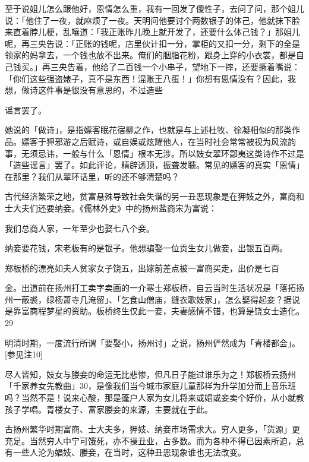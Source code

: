 \begin{BookQuote}
至于说姐儿怎么跟他好，恩情怎么重，我有一回发了傻性子，去问了问，那个姐儿说：「他住了一夜，就麻烦了一夜。天明问他要讨个两数银子的体己，他就抹下脸来直着脖儿梗，乱嚷道：「我正账昨儿晚上就开发了，还要什么体己钱？」那姐儿呢，再三央告说：「正账的钱呢，店里伙计扣一分，掌柜的又扣一分，剩下的全是领家的妈拿去，一个钱也放不出来。俺们的胭脂花粉，跟身上穿的小衣裳，都是自己钱买。」再三央告着，他给了二百钱一个小串子，望地下一摔，还要撅着嘴说：「你们这些强盗婊子，真不是东西！混账王八蛋！」你想有恩情没有？因此，我想，做诗这件事是很没有意思的，不过造些
\end{BookQuote}

谣言罢了。

她说的「做诗」，是指嫖客眠花宿柳之作，也就是与上述杜牧、徐凝相似的那类作品。嫖客于狎邪游之后赋诗，或自娱或炫耀他人，在当时社会常常被视为风流韵事，无须忌讳，一般与什么「恩情」根本无涉。所以妓女翠环鄙夷这类诗作不过是「造些谣言」罢了。如此评论，精辟透顶，振聋发聩。常见的嫖客的真实「恩情」在那里？我们从翠环话里，听的还不够清楚吗？

古代经济繁荣之地，贫富悬殊导致社会失谐的另一丑恶现象是在狎妓之外，富商和士大夫们还要纳妾。《儒林外史》中的扬州盐商宋为富说：

\begin{BookQuote}
我们总商人家，一年至少也娶七八个妾。
\end{BookQuote}

纳妾要花钱，宋老板有的是银子。他想骗娶一位贡生女儿做妾，出银五百两。

郑板桥的漂亮如夫人贫家女子饶五，出嫁前差点被一富商买走，出价是七百


\noindent 金。出道前在扬州打工卖字卖画的一介寒士郑板桥，自云当时生活状况是「落拓扬州一蔽裘，绿杨萧寺几淹留」、「乞食山僧庙，缝衣歌妓家」，怎么娶得起妾？据说是靠富商程梦星的资助。板桥终生仅此一妾，夫妻感情不错，也算是饶女士造化。29

明清时期，一度流行所谓「要娶小，扬州讨」之说，扬州俨然成为「青楼都会」。[参见注10]

尽人皆知，妓女与媵妾的命运无比悲惨，但凡日子能过谁乐为之！郑板桥云扬州「千家养女先教曲」30，是像我们当今城市家庭儿童那样为升学加分而上音乐班吗？当然不是！说来心酸，那是蓬户人家为女儿将来或娼或妾卖个好价，从小就教孩子学唱。青楼女子、富家媵妾的来源，主要就在于此。

古扬州繁华时期富商、士大夫多，狎妓、纳妾市场需求大。穷人更多，「货源」更充足。当然穷人中宁可饿死，亦不操丑业，占多数。而为各种不得已因素所迫，总有一些人沦为娼妓、媵妾，在当时，这种丑恶现象谁也无法改变。


